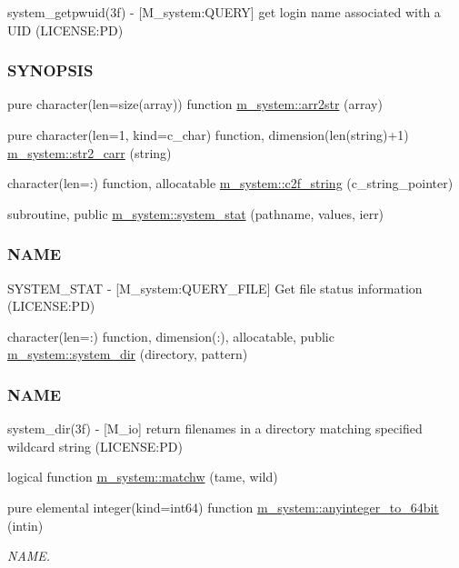\begin{DoxyCompactItemize}
\begin{DoxyCompactList}
system\+\_\+getpwuid(3f) -\/ \mbox{[}M\+\_\+system\+:Q\+U\+E\+RY\mbox{]} get login name associated with a U\+ID (L\+I\+C\+E\+N\+SE\+:PD) \subsubsection*{S\+Y\+N\+O\+P\+S\+IS}\end{DoxyCompactList}\item 
pure character(len=size(array)) function \mbox{\hyperlink{namespacem__system_aeb3d7d4cb39d59917910a3ae2532206d}{m\+\_\+system\+::arr2str}} (array)
\item 
pure character(len=1, kind=c\+\_\+char) function, dimension(len(string)+1) \mbox{\hyperlink{namespacem__system_a58bb591b5b9fefec3960a28361aae07a}{m\+\_\+system\+::str2\+\_\+carr}} (string)
\item 
character(len=\+:) function, allocatable \mbox{\hyperlink{namespacem__system_aa7c5445619aa15cd2301fe17f7c3b73c}{m\+\_\+system\+::c2f\+\_\+string}} (c\+\_\+string\+\_\+pointer)
\item 
subroutine, public \mbox{\hyperlink{namespacem__system_a5bb1ebcebe181e07fd24e908cacc9887}{m\+\_\+system\+::system\+\_\+stat}} (pathname, values, ierr)
\begin{DoxyCompactList}\small\item\em \subsubsection*{N\+A\+ME}

S\+Y\+S\+T\+E\+M\+\_\+\+S\+T\+AT -\/ \mbox{[}M\+\_\+system\+:Q\+U\+E\+R\+Y\+\_\+\+F\+I\+LE\mbox{]} Get file status information (L\+I\+C\+E\+N\+SE\+:PD) \end{DoxyCompactList}\item 
character(len=\+:) function, dimension(\+:), allocatable, public \mbox{\hyperlink{namespacem__system_a744f46033ef5e7ae95ec6cbff3ae3f89}{m\+\_\+system\+::system\+\_\+dir}} (directory, pattern)
\begin{DoxyCompactList}\small\item\em \subsubsection*{N\+A\+ME}

system\+\_\+dir(3f) -\/ \mbox{[}M\+\_\+io\mbox{]} return filenames in a directory matching specified wildcard string (L\+I\+C\+E\+N\+SE\+:PD) \end{DoxyCompactList}\item 
logical function \mbox{\hyperlink{namespacem__system_a0fccb69d0a56044b05e85b8df9f90aea}{m\+\_\+system\+::matchw}} (tame, wild)
\item 
pure elemental integer(kind=int64) function \mbox{\hyperlink{namespacem__system_a151da54be39dddcf270cceeff3243438}{m\+\_\+system\+::anyinteger\+\_\+to\+\_\+64bit}} (intin)
\begin{DoxyCompactList}\small\item\em N\+A\+ME. \end{DoxyCompactList}\end{DoxyCompactItemize}
